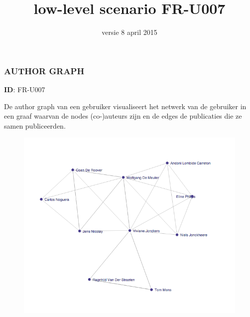 \documentclass{article}
\begin{document}
\date{versie 8 april 2015}
\title{low-level scenario FR-U007}
\maketitle


\subsubsection*{AUTHOR GRAPH}
\vspace{2 mm}

\textbf{ID}: FR-U007
\vspace{2 mm}

De author graph van een gebruiker visualiseert het netwerk van de gebruiker in een graaf waarvan de nodes (co-)auteurs zijn en de edges de publicaties die ze samen publiceerden. 


\begin{figure}[!h]
\includegraphics[width=1.1\textwidth]{basicGraph.png}
\end{figure}
\end{document}
